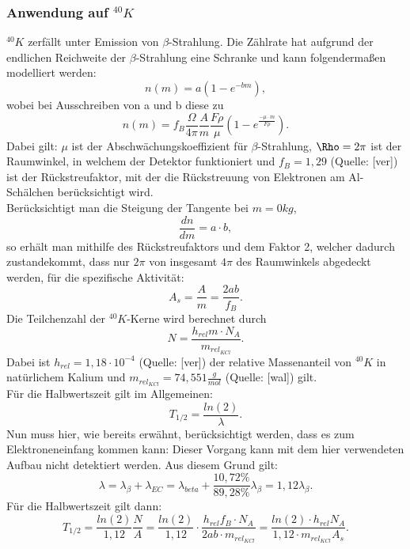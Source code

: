   \subsubsection{Anwendung auf $^{40}K$}
   $^{40}K$ zerfällt unter Emission von $\beta$-Strahlung. Die Zählrate hat aufgrund der endlichen Reichweite der $\beta$-Strahlung eine Schranke und kann folgendermaßen modelliert werden: \[n(m)=a(1-e^{-bm}),\] wobei bei Ausschreiben von a und b diese zu \[n(m)=f_{B}\frac{\Omega}{4\pi}\frac{A}{m}\frac{F\rho}{\mu}\left(1-e^{\frac{-\mu\cdot m}{F\rho}}\right).\] Dabei gilt: $\mu$ ist der Abschwächungskoeffizient für $\beta$-Strahlung, $\Rho=2\pi$ ist der Raumwinkel, in welchem der Detektor funktioniert und $f_{B}=1,29$ (Quelle: [ver]) ist der Rückstreufaktor, mit der die Rückstreuung von Elektronen am Al-Schälchen berücksichtigt wird. \\
   Berücksichtigt man die Steigung der Tangente bei $m=0kg$, \[\frac{dn}{dm}=a\cdot b,\] so erhält man mithilfe des Rückstreufaktors und dem Faktor 2, welcher dadurch zustandekommt, dass nur $2\pi$ von insgesamt $4\pi$ des Raumwinkels abgedeckt werden, für die spezifische Aktivität: \[A_{s}=\frac{A}{m}=\frac{2ab}{f_{B}}.\] Die Teilchenzahl der $^{40}K$-Kerne wird berechnet durch \[N=\frac{h_{rel}m\cdot N_{A}}{m_{rel_{KCl}}}.\] Dabei ist $h_{rel}=1,18\cdot10^{-4}$ (Quelle: [ver]) der relative Massenanteil von $^{40}K$ in natürlichem Kalium und $m_{rel_{KCl}}=74,551\frac{g}{mol}$ (Quelle: [wal]) gilt. \\
   Für die Halbwertszeit gilt im Allgemeinen: \[T_{1/2}=\frac{ln(2)}{\lambda}.\] Nun muss hier, wie bereits erwähnt, berücksichtigt werden, dass es zum Elektroneneinfang kommen kann: Dieser Vorgang kann mit dem hier verwendeten Aufbau nicht detektiert werden. Aus diesem Grund gilt: \[\lambda=\lambda_{\beta}+\lambda_{EC}=\lambda_{beta}+\frac{10,72\%}{89,28\%}\lambda_{\beta}=1,12\lambda_{\beta}.\] 
   Für die Halbwertszeit gilt dann: \[T_{1/2}=\frac{ln(2)}{1,12}\frac{N}{A}=\frac{ln(2)}{1,12}\cdot\frac{h_{rel}f_{B}\cdot N_{A}}{2ab\cdot m_{rel_{KCl}}}=\frac{ln(2)\cdot h_{rel}N_{A}}{1,12\cdot m_{rel_{KCl}}A_{s}}.\]
